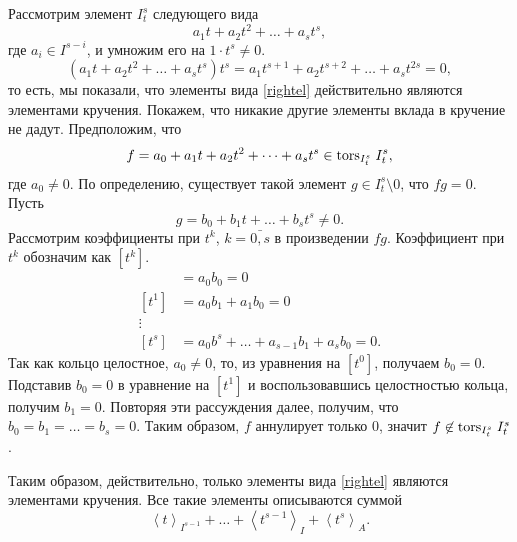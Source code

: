     \begin{Proof}
        Рассмотрим элемент $I^s_t$ следующего вида 
        \begin{equation} \label{rightel}
            a_1t + a_2t^2 + \dots + a_st^s,
        \end{equation}
        где $a_i \in I^{s - i}$, и умножим его на $1\cdot t^s \neq 0$.
        \begin{equation*}
            (a_1t + a_2t^2 + \dots + a_st^s)t^s = a_1t^{s + 1} + a_2t^{s + 2} + \dots + a_st^{2s} = 0,
        \end{equation*}
        то есть, мы показали, что элементы вида \eqref{rightel} действительно являются элементами кручения.
        Покажем, что никакие другие элементы вклада в кручение не дадут. Предположим, что
        \begin{equation*} 
            f = a_0 + a_1t + a_2t^2 + \dots + a_st^s \in \textup{tors}_{I^s_t}\;I^s_t,
        \end{equation*}
        где $a_0 \neq 0$. По определению, существует такой элемент $g \in I^s_t \setminus 0$, что
        $fg = 0.$
        Пусть 
        \begin{equation*}
            g = b_0 + b_1t + \dots + b_st^s \neq 0.
        \end{equation*}
        Рассмотрим коэффициенты при $t^k$, $k = \bar{0, s}$ в произведении $fg$. Коэффициент при $t^k$ обозначим как $[t^k]$.
        \begin{align*}
            [t^0] &= a_0b_0 = 0\\
            [t^1] &= a_0b_1 + a_1b_0 = 0\\
            \vdots\\
            [t^s] &= a_0b^s + \dots + a_{s-1}b_1 + a_sb_0 = 0.
        \end{align*}
        Так как кольцо целостное, $a_0 \neq 0$, то, из уравнения на $[t^0]$, получаем $b_0 = 0$. Подставив
        $b_0 = 0$ в уравнение на $[t^1]$ и воспользовавшись целостностью кольца, получим $b_1 = 0$. Повторяя 
        эти рассуждения далее, получим, что $b_0 = b_1 = \dots = b_s = 0$. Таким образом, $f$ аннулирует 
        только 0, значит $f \not \in \textup{tors}_{I^s_t}\;I^s_t$. 

        Таким образом, действительно, только элементы вида \eqref{rightel} являются элементами кручения.
        Все такие элементы описываются суммой 
        \begin{equation*}
            \left< t \right>_{I^{s-1}} + 
            \dots +
            \left< t^{s-1} \right>_{I} + 
            \left< t^s \right>_A.
        \end{equation*}
    \end{Proof}

